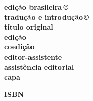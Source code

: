 \newcommand{\linha}[2]{\ifdef{#2}{\linhalayout{#1}{#2}}{}}

\begingroup\tiny
\parindent=0cm
\thispagestyle{empty}

\textbf{edição brasileira\,©}\\
\textbf{tradução e introdução\,©}\\

\textbf{título original}\\

\textbf{edição}\\
\textbf{coedição}\\
\textbf{editor-assistente}\\
\textbf{assistência editorial}\\
\textbf{capa}\medskip

\textbf{ISBN}\smallskip


